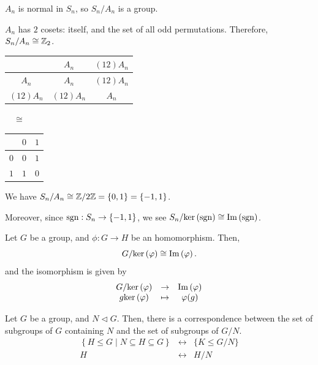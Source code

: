 \begin{example}
    $A_n$ is normal in $S_n$, so $S_n/A_n$ is a group.

    $A_n$ has $2$ cosets: itself, and the set of all odd permutations. Therefore, $S_n/A_n \cong \mathbb{Z}_2$.

    \begin{center}
        \begin{tabular}{c|c|c}
                      & $A_n$     & $(12)A_n$ \\ \hline
            $A_n$     & $A_n$     & $(12)A_n$ \\ \hline
            $(12)A_n$ & $(12)A_n$ & $A_n$
        \end{tabular}
        $\quad \cong \quad$
        \begin{tabular}{c|c|c}
                & $0$ & $1$ \\ \hline
            $0$ & $0$ & $1$ \\ \hline
            $1$ & $1$ & $0$
        \end{tabular}
    \end{center}

    We have $S_n/A_n \cong \mathbb{Z}/2\mathbb{Z} = \{ 0, 1 \} = \{ -1, 1 \}$.

    Moreover, since $\mathrm{sgn}: S_n \to \{ -1, 1 \}$, we see $S_n/\mathrm{ker}\left( \mathrm{sgn} \right) \cong \mathrm{Im}\left( \mathrm{sgn} \right)$.
\end{example}

\begin{theorem}\label{thm:first-isomorphism}
    Let $G$ be a group, and $\phi: G \to H$ be an homomorphism. Then, \[
        G/\mathrm{ker}\left( \varphi \right) \cong \mathrm{Im}\left( \varphi \right).
    \] and the isomorphism is given by \[
        \begin{matrix}
            G/\mathrm{ker}\left( \varphi \right) & \to     & \mathrm{Im}\left( \varphi \right) \\
            g\mathrm{ker}\left( \varphi \right)  & \mapsto & \varphi(g)
        \end{matrix}
    \]
\end{theorem}

\begin{theorem}\label{thm:correspondence}
    Let $G$ be a group, and $N \triangleleft G$. Then, there is a correspondence between the set of subgroups of $G$ containing $N$ and the set of subgroups of $G/N$. \[
        \begin{matrix}
            \left\{ H \le G \mid N \subseteq H \subseteq G \right\} & \longleftrightarrow & \{ K \le G/N \} \\
            H                                                       & \longleftrightarrow & H/N
        \end{matrix}
    \]
\end{theorem}

